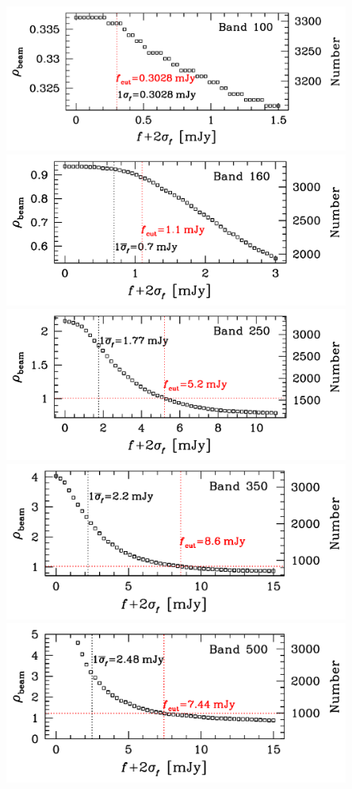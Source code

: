 \documentclass[11pt,a4paper]{article}
\begin{document}
\begin{center}
	\includegraphics[width=0.85\textwidth]{plot_cutting_flux_100} \\
	\includegraphics[width=0.85\textwidth]{plot_cutting_flux_160} \\
	\includegraphics[width=0.85\textwidth]{plot_cutting_flux_250} \\
	\includegraphics[width=0.85\textwidth]{plot_cutting_flux_350} \\
	\includegraphics[width=0.85\textwidth]{plot_cutting_flux_500} \\

\end{center}
\end{document}
